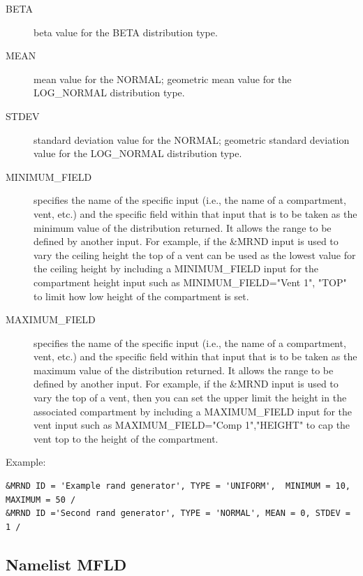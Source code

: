 \documentclass[12pt,twoside]{book}
\begin{document}
\begin{description}
  \item[BETA] beta value for the {\ct BETA} distribution type.
  \item[MEAN] mean value for the {\ct NORMAL}; geometric mean value for the {\ct LOG\_NORMAL} distribution type.
  \item[STDEV] standard deviation value for the {\ct NORMAL}; geometric standard deviation value for the {\ct LOG\_NORMAL} distribution type.
  \item[MINIMUM\_FIELD] specifies the name of the specific input (i.e., the name of a compartment, vent, etc.) and the specific field within that input that is to be taken as the minimum value of the distribution returned. It allows the range to be defined by another input. For example, if the {\ct \&MRND} input is used to vary the ceiling height the top of a vent can be used as the lowest value for the ceiling height by including a {\ct MINIMUM\_FIELD} input for the compartment height input such as {\ct MINIMUM\_FIELD="Vent 1", "TOP"} to limit how low height of the compartment is set.
  \item[MAXIMUM\_FIELD] specifies the name of the specific input (i.e., the name of a compartment, vent, etc.) and the specific field within that input that is to be taken as the maximum value of the distribution returned. It allows the range to be defined by another input. For example, if the {\ct \&MRND} input is used to vary the top of a vent, then you can set the upper limit the height in the associated compartment by including a {\ct MAXIMUM\_FIELD} input for the vent input such as {\ct MAXIMUM\_FIELD="Comp 1","HEIGHT"} to cap the vent top to the height of the compartment.
\end{description}

\vspace{\baselineskip}
\noindent Example:
\begin{lstlisting}
&MRND ID = 'Example rand generator', TYPE = 'UNIFORM',  MINIMUM = 10, MAXIMUM = 50 /
&MRND ID ='Second rand generator', TYPE = 'NORMAL', MEAN = 0, STDEV = 1 /
\end{lstlisting}

\subsection{Namelist MFLD}
\end{document}
